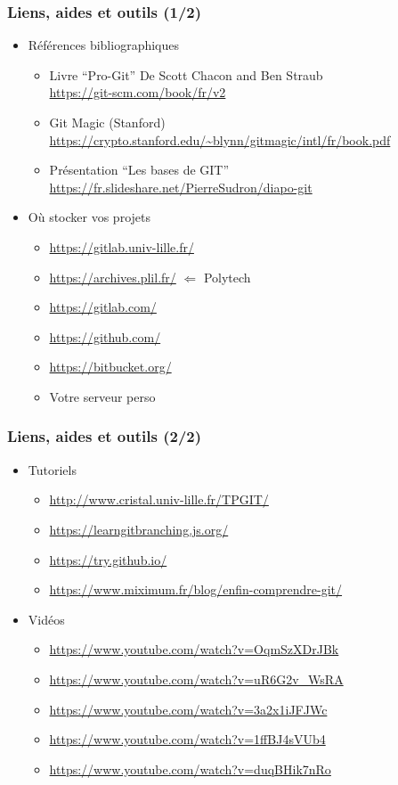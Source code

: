 \documentclass[table,tikz,12pt,svgnames]{beamer}
\begin{document}

\begin{frame}
\frametitle{Liens, aides et outils (1/2)}
\begin{itemize}
	\item Références bibliographiques
	\begin{itemize}
		\item Livre ``Pro-Git'' De Scott Chacon and Ben Straub\\
		\url{https://git-scm.com/book/fr/v2}
		\item Git Magic (Stanford)\\
		\url{https://crypto.stanford.edu/~blynn/gitmagic/intl/fr/book.pdf}
		\item Présentation ``Les bases de GIT''
		\url{https://fr.slideshare.net/PierreSudron/diapo-git}

	\end{itemize}
	\vspace{1em}

	\item Où stocker vos projets
	\begin{itemize}
		\item \url{https://gitlab.univ-lille.fr/}
		\item \url{https://archives.plil.fr/} $\Leftarrow$ Polytech
		\item \url{https://gitlab.com/}		
		\item \url{https://github.com/}
		\item \url{https://bitbucket.org/}
		\item Votre serveur perso
	\end{itemize}
\end{itemize}
\end{frame}

\begin{frame}
\frametitle{Liens, aides et outils (2/2)}
\begin{itemize}
	\item Tutoriels
	\begin{itemize}
		\item \url{http://www.cristal.univ-lille.fr/TPGIT/}
		\item \url{https://learngitbranching.js.org/}
		\item \url{https://try.github.io/}
		\item \url{https://www.miximum.fr/blog/enfin-comprendre-git/}
	\end{itemize}
	\item Vidéos
	\begin{itemize}
		\item \url{https://www.youtube.com/watch?v=OqmSzXDrJBk}
		\item \url{https://www.youtube.com/watch?v=uR6G2v_WsRA}
		\item \url{https://www.youtube.com/watch?v=3a2x1iJFJWc}
		\item \url{https://www.youtube.com/watch?v=1ffBJ4sVUb4}
		\item \url{https://www.youtube.com/watch?v=duqBHik7nRo}
	\end{itemize}
\end{itemize}
\end{frame}


\end{document}

